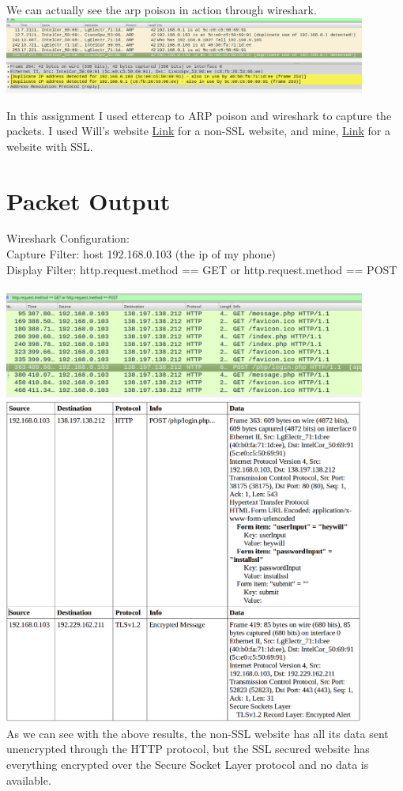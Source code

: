 \documentclass[a4paper, 11pt]{article}
\begin{document}
We can actually see the arp poison in action through wireshark.\\
\includegraphics[width=450px]{arppoisoninaction.png}

In this assignment I used ettercap to ARP poison and wireshark to capture the packets. I used Will's website \href{http://williamsigouin.xyz/}{Link} for a non-SSL website, and mine, \href{https://notturing.ddns.net/tyler/IS_ASS2/form.php}{Link} for a website with SSL.

\section*{Packet Output}

Wireshark Configuration:\\
Capture Filter: host 192.168.0.103 (the ip of my phone)\\
Display Filter: http.request.method == GET or http.request.method == POST\\
\\
\includegraphics[width=450px]{arppoison.png}
\\
\includegraphics[width=450px]{packetoutput.png}
\\
As we can see with the above results, the non-SSL website has all its data sent unencrypted through the HTTP protocol, but the SSL secured website has everything encrypted over the Secure Socket Layer protocol and no data is available.
\end{document}
